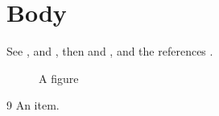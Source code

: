 \documentclass{article}
\begin{document}
\tableofcontents
\label{toc}
\listoffigures
\label{lof}
\listoftables
\label{lot}
\section{Body}
See ,  and , then  and , and the references .
\begin{figure}[h]\centering\caption{A figure}\end{figure}
\begin{table}[h]\centering\caption{A table}\end{table}
\begin{thebibliography}{9}
 An item.\label{bib}
\end{thebibliography}
\end{document}
